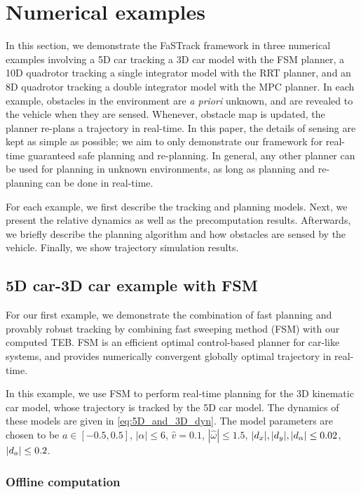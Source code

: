 \section{Numerical examples} \label{sec:results}

In this section, we demonstrate the FaSTrack framework in three numerical examples involving a 5D car tracking a 3D car model with the FSM planner, a 10D quadrotor tracking a single integrator model with the RRT planner, and an 8D quadrotor tracking a double integrator model with the MPC planner.
In each example, obstacles in the environment are \textit{a priori} unknown, and are revealed to the vehicle when they are sensed.
Whenever, obstacle map is updated, the planner re-plans a trajectory in real-time.
In this paper, the details of sensing are kept as simple as possible; we aim to only demonstrate our framework for real-time guaranteed safe planning and re-planning.
In general, any other planner can be used for planning in unknown environments, as long as planning and re-planning can be done in real-time.

For each example, we first describe the tracking and planning models. 
Next, we present the relative dynamics as well as the precomputation results. 
Afterwards, we briefly describe the planning algorithm and how obstacles are sensed by the vehicle. 
Finally, we show trajectory simulation results.

\subsection{5D car-3D car example with FSM \label{sec:reach_planner}}

For our first example, we demonstrate the combination of fast planning and provably robust tracking by combining fast sweeping method (FSM) \cite{Takei2013} with our computed TEB. 
FSM is an efficient optimal control-based planner for car-like systems, and provides numerically convergent globally optimal trajectory in real-time.

In this example, we use FSM to perform real-time planning for the 3D kinematic car model, whose trajectory is tracked by the 5D car model.
The dynamics of these models are given in \eqref{eq:5D_and_3D_dyn}.
The model parameters are chosen to be $a \in [-0.5, 0.5]$, $|\alpha|\le 6$, $\hat v = 0.1$, $|\hat\omega|\le 1.5$, $|d_x|, |d_y|, |d_\alpha|\le0.02$, $|d_a| \le 0.2$.

\subsubsection{Offline computation}

